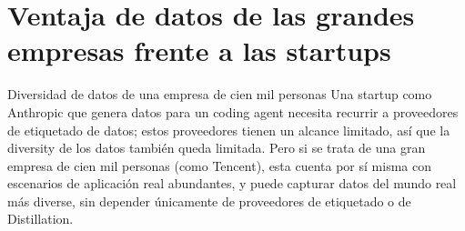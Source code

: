 \section{Ventaja de datos de las grandes empresas frente a las startups}

\begin{knowledgebox}{Diversidad de datos de una empresa de cien mil personas}
Una startup como Anthropic que genera datos para un coding agent necesita recurrir a proveedores de etiquetado de datos; estos proveedores tienen un alcance limitado, así que la diversity de los datos también queda limitada. Pero si se trata de una gran empresa de cien mil personas (como Tencent), esta cuenta por sí misma con escenarios de aplicación real abundantes, y puede capturar datos del mundo real más diverse, sin depender únicamente de proveedores de etiquetado o de Distillation.
\end{knowledgebox}

